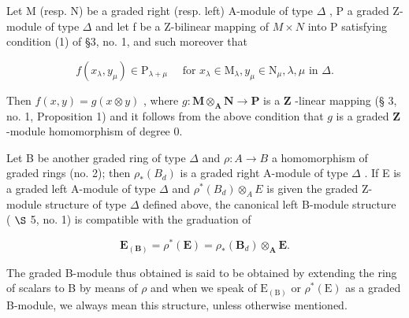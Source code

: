 Let M (resp. N) be a graded right (resp. left) A-module of type \(\Delta\) , P a graded Z-module of type \(\Delta\) and let f be a Z-bilinear mapping of \(M \times N\) into P satisfying condition (1) of §3, no. 1, and such moreover that

\[
f (x _ {\lambda}, y _ {\mu}) \in \mathrm{P} _ {\lambda + \mu} \quad \text { for } x _ {\lambda} \in \mathrm{M} _ {\lambda}, y _ {\mu} \in \mathrm{N} _ {\mu}, \lambda , \mu \text { in } \Delta .
\]

Then \(f(x, y) = g(x \otimes y)\) , where \(g: \mathbf{M} \otimes_{\mathbf{A}} \mathbf{N} \to \mathbf{P}\) is a \(\mathbf{Z}\) -linear mapping (§ 3, no. 1, Proposition 1) and it follows from the above condition that \(g\) is a graded \(\mathbf{Z}\) -module homomorphism of degree 0.

Let B be another graded ring of type \(\Delta\) and \(\rho: A \to B\) a homomorphism of graded rings (no. 2); then \(\rho_*(B_d)\) is a graded right A-module of type \(\Delta\) . If E is a graded left A-module of type \(\Delta\) and \(\rho^*(B_d) \otimes_A E\) is given the graded Z-module structure of type \(\Delta\) defined above, the canonical left B-module structure ( \(\S\) 5, no. 1) is compatible with the graduation of

\[
\mathbf {E} _ {(\mathbf {B})} = \rho^ {*} (\mathbf {E}) = \rho_ {*} (\mathbf {B} _ {d}) \otimes_ {\mathbf {A}} \mathbf {E}.
\]

The graded B-module thus obtained is said to be obtained by extending the ring of scalars to B by means of \(\rho\) and when we speak of \(\mathrm{E}_{(\mathrm{B})}\) or \(\rho^{*}(\mathrm{E})\) as a graded B-module, we always mean this structure, unless otherwise mentioned.

